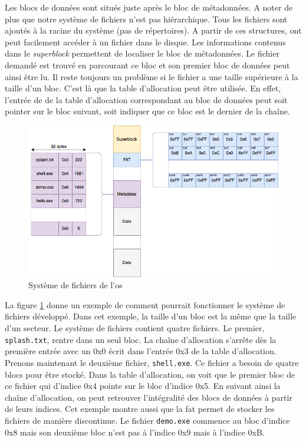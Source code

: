 Les blocs de données sont situés juste après le bloc de métadonnées. A noter de
plus que notre système de fichiers n'est pas hiérarchique. Tous les fichiers sont
ajoutés à la racine du système (pas de répertoires). A partir de ces structures,
ont peut facilement accéder à un fichier dans le disque. Les informations contenus
dans le \textit{superblock} permettent de localiser le bloc de métadonnées. Le
fichier demandé est trouvé en parcourant ce bloc et son premier bloc de données
peut ainsi être lu. Il reste toujours un problème si le fichier a une taille supérieure
à la taille d'un bloc. C'est là que la table d'allocation peut être
utilisée. En effet, l'entrée de de la table d'allocation correspondant au bloc
de données peut soit pointer sur le bloc suivant, soit indiquer que ce bloc est
le dernier de la chaîne. \newpage

\begin{figure}[!h]
  \centering
  \includegraphics[scale=0.6]{images/microfs.png}
  \caption{Système de fichiers de l'\acrshort{os}}
  \label{microfs}
\end{figure}

La figure \ref{microfs} donne un exemple de comment pourrait fonctionner le système
de fichiers développé. Dans cet exemple, la taille d'un bloc est la même que la
taille d'un secteur. Le système de fichiers contient quatre fichiers. Le premier,
\texttt{splash.txt}, rentre dans un seul bloc. La chaîne d'allocation
s'arrête dès la première entrée avec un 0x0 écrit dans l'entrée 0x3 de la table
d'allocation. Prenons maintenant le deuxième fichier, \texttt{shell.exe}.
Ce fichier a besoin de quatre blocs pour être stocké. Dans la table d'allocation,
on voit que le premier bloc de ce fichier qui d'indice 0x4 pointe sur le bloc
d'indice 0x5. En suivant ainsi la chaîne d'allocation, on peut retrouver l'intégralité
des blocs de données à partir de leurs indices. Cet exemple montre aussi que la
\acrshort{fat} permet de stocker les fichiers de manière discontinue. Le fichier
\texttt{demo.exe} commence au bloc d'indice 0x8 mais son deuxième bloc
n'est pas à l'indice 0x9 mais à l'indice 0xB.

